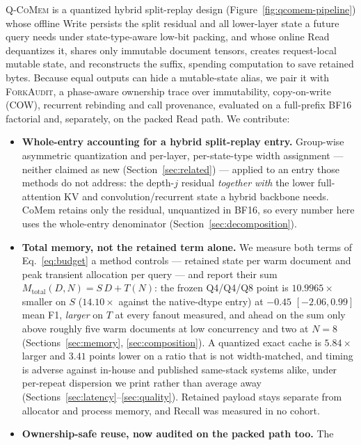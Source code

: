 \documentclass{article}
\newcommand{\qcomem}{\textsc{Q-CoMem}}
\newcommand{\method}{\textsc{ForkAudit}}
\begin{document}
\qcomem{} is a quantized hybrid split-replay design
(Figure~\ref{fig:qcomem-pipeline}) whose offline Write persists the split
residual and all lower-layer state a future query needs under state-type-aware
low-bit packing, and whose online Read dequantizes it, shares only immutable
document tensors, creates request-local mutable state, and reconstructs the
suffix, spending computation to save retained bytes.  Because equal outputs can
hide a mutable-state alias, we
pair it with \method{}, a phase-aware ownership trace over immutability,
copy-on-write (COW), recurrent rebinding and call provenance, evaluated on a
full-prefix BF16 factorial and, separately, on the packed Read path.  We
contribute:
\begin{itemize}
  \setlength{\itemsep}{0pt}
  \setlength{\parskip}{0pt}
  \setlength{\topsep}{2pt}
  \setlength{\partopsep}{0pt}
  \item \textbf{Whole-entry accounting for a hybrid split-replay entry.}
Group-wise asymmetric quantization and per-layer, per-state-type width
assignment --- neither claimed as new (Section~\ref{sec:related}) --- applied to
an entry those methods do not address: the depth-$j$ residual \emph{together
with} the lower full-attention KV and convolution/recurrent state a hybrid
backbone needs.  CoMem retains only the residual, unquantized in BF16, so every
number here uses the whole-entry denominator (Section~\ref{sec:decomposition}).
  \item \textbf{Total memory, not the retained term alone.}  We measure both
terms of Eq.~\ref{eq:budget} a method controls --- retained state per warm
document and peak transient allocation per query --- and report their sum
$M_{\mathrm{total}}(D,N)=S\,D+T(N)$: the frozen Q4/Q4/Q8 point is
$10.9965\times$ smaller on $S$ ($14.10\times$ against the native-dtype entry) at
$-0.45$ $[-2.06,0.99]$ mean F1, \emph{larger} on $T$ at every fanout measured,
and ahead on the sum only above roughly five warm documents at low concurrency
and two at $N=8$ (Sections~\ref{sec:memory}, \ref{sec:composition}).  A
quantized exact cache is $5.84\times$ larger and $3.41$ points lower on a ratio
that is not width-matched, and timing is adverse against in-house and published
same-stack systems alike, under per-repeat dispersion we print rather than
average away (Sections~\ref{sec:latency}--\ref{sec:quality}).  Retained payload
stays separate from allocator and process memory, and Recall was measured in no
cohort.
  \item \textbf{Ownership-safe reuse, now audited on the packed path too.}  The

\end{itemize}
\end{document}
